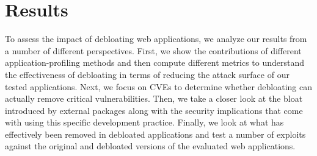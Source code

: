 \section{Results}
\label{section:results}

To assess the impact of debloating web applications, we analyze our results
from a number of different perspectives. First, we show the contributions of different application-profiling methods and then compute different metrics
to understand the effectiveness of debloating in terms of reducing the attack surface of our tested applications. Next, we focus on CVEs to determine whether
debloating can actually remove critical vulnerabilities. Then, we take
a closer look at the bloat introduced by external packages along with the
security implications that come with using this specific development practice.
Finally, we look at what has effectively been removed in debloated applications and test a number of exploits against the original and debloated versions of the evaluated web applications.
  
